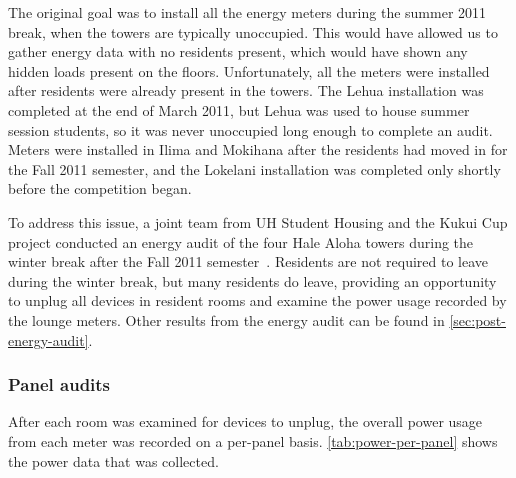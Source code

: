The original goal was to install all the energy meters during the summer 2011 break, when the towers are typically unoccupied. This would have allowed us to gather energy data with no residents present, which would have shown any hidden loads present on the floors. Unfortunately, all the meters were installed after residents were already present in the towers. The Lehua installation was completed at the end of March 2011, but Lehua was used to house summer session students, so it was never unoccupied long enough to complete an audit. Meters were installed in Ilima and Mokihana after the residents had moved in for the Fall 2011 semester, and the Lokelani installation was completed only shortly before the competition began.

To address this issue, a joint team from UH \Manoa Student Housing and the Kukui Cup project conducted an energy audit of the four Hale Aloha towers during the winter break after the Fall 2011 semester~\cite{csdl2-11-12}. Residents are not required to leave during the winter break, but many residents do leave, providing an opportunity to unplug all devices in resident rooms and examine the power usage recorded by the lounge meters. Other results from the energy audit can be found in \autoref{sec:post-energy-audit}.


\subsubsection{Panel audits}
\label{sec:panel-audits}

After each room was examined for devices to unplug, the overall power usage from each meter was recorded on a per-panel basis. \autoref{tab:power-per-panel} shows the power data that was collected.

